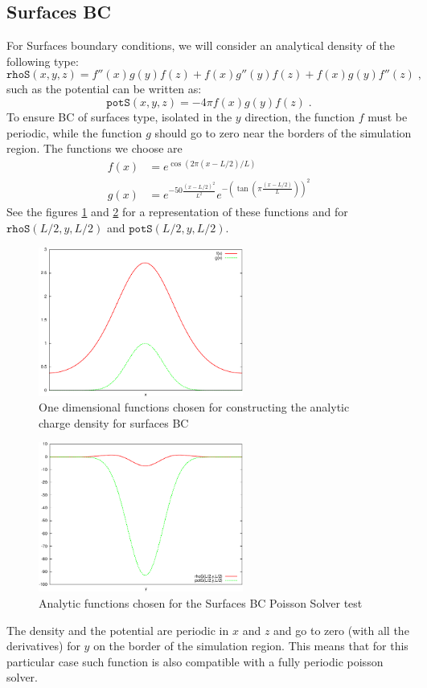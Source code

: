 \documentclass[a4paper]{article}
\newcommand{\be}{\begin{equation}}
\newcommand{\ee}{\end{equation}}
\begin{document}
\subsection*{Surfaces BC}
For Surfaces boundary conditions, we will consider an analytical density of the following type:
\be
\texttt{rhoS}(x,y,z)= f''(x) g(y) f(z) + f(x) g''(y) f(z) + f(x) g(y) f''(z)\;,
\ee
such as the potential can be written as:
\be
\texttt{potS}(x,y,z)=-4 \pi f(x) g(y) f(z)\;.
\ee
To ensure BC of surfaces type, isolated in the $y$ direction, the function $f$ must be periodic, while the function $g$ should go to zero near the borders of the simulation region.
The functions we choose are
\begin{align}
 f(x)&=e^{\cos \left(2 \pi (x-L/2)/L\right)} \\
 g(x)&=e^{-50 \frac{(x-L/2)^2}{L^2}} e^{-\left(\tan \left(\pi \frac{(x-L/2)}{L}\right)\right)^2}
\end{align}
See the figures \ref{fig2} and \ref{fig3} for a representation of these functions and for $\texttt{rhoS}(L/2,y,L/2)$ and $\texttt{potS}(L/2,y,L/2)$.
\begin{figure}[htbp]
 \centering \includegraphics[width=0.6\textwidth]{fandg.pdf}
\caption{One dimensional functions chosen for constructing the analytic charge density for surfaces BC}\label{fig2}
\end{figure}
\begin{figure}[htbp]
 \centering \includegraphics[width=0.6\textwidth]{rhoSpotS.pdf}
\caption{Analytic functions chosen for the Surfaces BC Poisson Solver test}\label{fig3}
\end{figure}
The density and the potential are periodic in $x$ and $z$ and go to zero (with all the derivatives) for $y$ on the border of the simulation region. This means that for this particular case such function is also compatible with a fully periodic poisson solver. 
\end{document}
